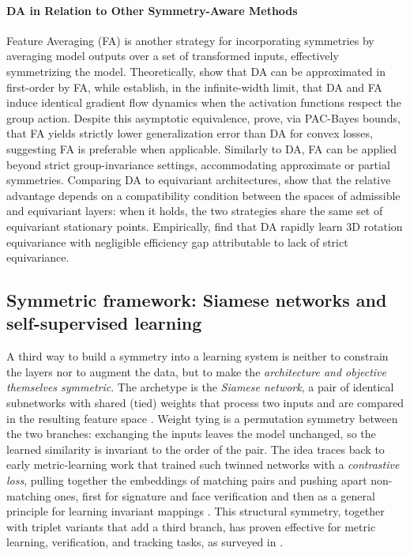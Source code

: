 \documentclass[mathematics,review,submit,moreauthors]{Definitions/mdpi}
\begin{document}
\paragraph{DA in Relation to Other Symmetry-Aware Methods}
Feature Averaging (FA) is another strategy for incorporating symmetries by averaging model outputs over a set of transformed inputs, effectively symmetrizing the model.
Theoretically, \citet{dao2019p3icml} show that DA can be approximated in first-order by FA, while \citet{maass2024} establish, in the infinite-width limit, that DA and FA induce identical gradient flow dynamics when the activation functions respect the group action.
Despite this asymptotic equivalence, \citet{lyle2020} prove, via PAC-Bayes bounds, that FA yields strictly lower generalization error than DA for convex losses, suggesting FA is preferable when applicable.
Similarly to DA, FA can be applied beyond strict group-invariance settings, accommodating approximate or partial symmetries.
Comparing DA to equivariant architectures, \citet{nordenfors2024} show that the relative advantage depends on a compatibility condition between the spaces of admissible and equivariant layers: when it holds, the two strategies share the same set of equivariant stationary points.
Empirically, \citet{shen2026} find that DA rapidly learn 3D rotation equivariance with negligible efficiency gap attributable to lack of strict equivariance.

\subsection{Symmetric framework: Siamese networks and self-supervised learning}
A third way to build a symmetry into a learning system is neither to constrain the layers nor to augment the data, but to make the \emph{architecture and objective themselves symmetric}.
The archetype is the \emph{Siamese network}, a pair of identical subnetworks with shared (tied) weights that process two inputs and are compared in the resulting feature space \cite{ilina2022sa}.
Weight tying is a permutation symmetry between the two branches: exchanging the inputs leaves the model unchanged, so the learned similarity is invariant to the order of the pair.
The idea traces back to early metric-learning work that trained such twinned networks with a \emph{contrastive loss}, pulling together the embeddings of matching pairs and pushing apart non-matching ones, first for signature and face verification \cite{chopra2005} and then as a general principle for learning invariant mappings \cite{hadsell2006}.
This structural symmetry, together with triplet variants that add a third branch, has proven effective for metric learning, verification, and tracking tasks, as surveyed in \cite{ilina2022sa}.
\end{document}
